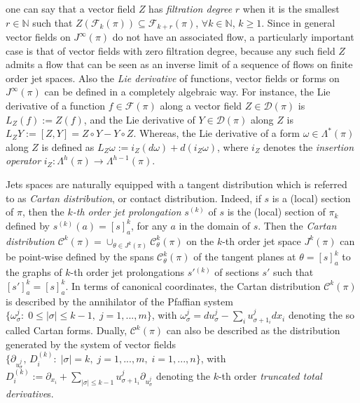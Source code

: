 \documentclass[12pt,english]{elsarticle}
\theoremstyle{plain}
\theoremstyle{plain}
\theoremstyle{remark}
\theoremstyle{plain}
\theoremstyle{definition}
\theoremstyle{definition}
\begin{document}
one can say that a vector field $Z$ has \textit{filtration degree}
$r$ when it is the smallest $r\in \mathbb{N}$ such that
$Z(\mathcal{F}_{k}(\pi ))\subseteq \mathcal{F}_{k+r}(\pi )$,
$\forall k\in \mathbb{N}$, $k\geq 1$. Since in general vector fields on
$J^{\infty}(\pi )$ do not have an associated flow, a particularly important
case is that of vector fields with zero filtration degree, because any
such field $Z$ admits a flow that can be seen as an inverse limit of a
sequence of flows on finite order jet spaces. Also the
\textit{Lie derivative} of functions, vector fields or forms on
$J^{\infty}(\pi )$ can be defined in a completely algebraic way. For instance,
the Lie derivative of a function $f\in \mathcal{F}(\pi )$ along a vector
field $Z\in \mathcal{D}(\pi )$ is $L_{Z}(f):=Z(f)$, and the Lie derivative
of $Y\in \mathcal{D}(\pi )$ along $Z$ is
$L_{Z}Y:=\left [Z,Y\right ]=Z\circ Y-Y\circ Z$. Whereas, the Lie derivative
of a form $\omega \in \Lambda ^{*}(\pi )$ along $Z$ is defined as
$L_{Z}\omega :=i_{Z}(d\omega )+d(i_{Z}\omega )$, where $i_{Z}$ denotes
the \textit{insertion operator}
$i_{Z}:\Lambda ^{h}(\pi )\longrightarrow \Lambda ^{h-1}(\pi )$.

Jets spaces are naturally equipped with a tangent distribution which is
referred to as \textit{Cartan distribution}, or contact distribution. Indeed,
if $s$ is a (local) section of $\pi $, then the $k$\textsl{-th
order jet prolongation} $s^{(k)}$ of $s$ is the (local) section of
$\pi _{k}$ defined by $s^{(k)}(a)=[s]_{a}^{k}$, for any $a$ in the domain
of $s$. Then the \textit{Cartan distribution}
$\mathcal{C}^{k}(\pi )=\cup _{\theta \in J^{k}(\pi )}\mathcal{C}_{
\theta}^{k}(\pi )$ on the $k$-th order jet space $J^{k}(\pi )$ can be point-wise
defined by the spans $\mathcal{C}_{\theta}^{k}(\pi )$ of the tangent planes
at $\theta =[s]_{a}^{k}$ to the graphs of $k$-th order jet prolongations
$s'{}^{(k)}$ of sections $s'$ such that $[s']_{a}^{k}=[s]_{a}^{k}$. In
terms of canonical coordinates, the Cartan distribution
$\mathcal{C}^{k}(\pi )$ is described by the annihilator of the Pfaffian
system
$\{\omega _{\sigma}^{j}:\;0\leq |\sigma |\leq k-1,\;j=1,...,m\}$, with
$\omega _{\sigma}^{j}=du_{\sigma}^{j}-\sum _{i}u_{\sigma +1_{i}}^{j}dx_{i}$
denoting the so called Cartan forms. Dually, $\mathcal{C}^{k}(\pi )$ can
also be described as the distribution generated by the system of vector
fields
$\{\partial _{u_{\sigma}^{j}},\,D_{i}^{(k)}:\;|\sigma |=k,\;j=1,...,m,
\;i=1,...,n\}$, with
$D_{i}^{(k)}:=\partial _{x_{i}}+\sum _{|\sigma |\leq k-1}{
\displaystyle u_{\sigma +1_{i}}^{j}\partial _{u_{\sigma}^{j}}}$ denoting
the $k$-th order \textit{truncated total derivative}s.
\end{document}
